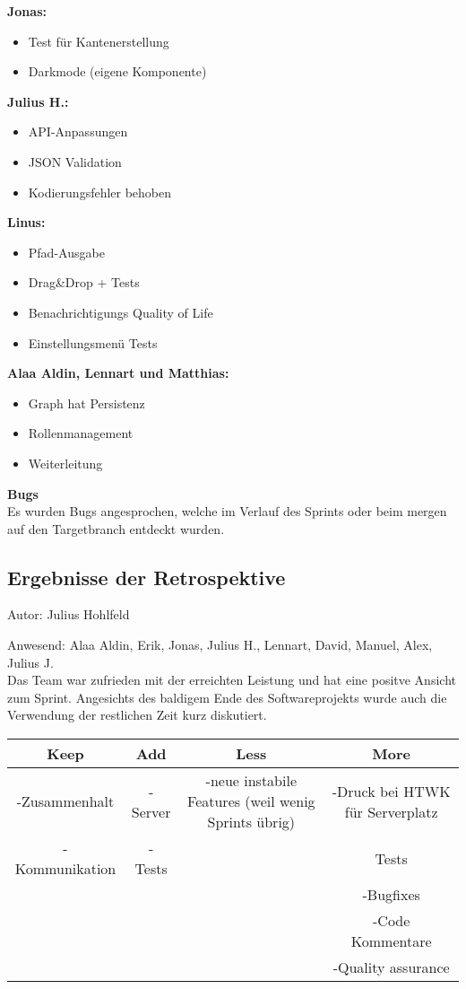 \textbf{Jonas:}
\begin{itemize}
\item Test für Kantenerstellung
\item Darkmode (eigene Komponente)
\end{itemize}

\textbf{Julius H.:}
\begin{itemize}
\item API-Anpassungen
\item JSON Validation
\item Kodierungsfehler behoben
\end{itemize}

\textbf{Linus:}
\begin{itemize}
\item Pfad-Ausgabe
\item Drag\&Drop + Tests
\item Benachrichtigungs Quality of Life
\item Einstellungsmenü Tests
\end{itemize}

\textbf{Alaa Aldin, Lennart und Matthias:}
\begin{itemize}
\item Graph hat Persistenz
\item Rollenmanagement
\item Weiterleitung
\end{itemize}

\textbf{Bugs}\\
Es wurden Bugs angesprochen, welche im Verlauf des Sprints oder beim mergen auf den Targetbranch entdeckt wurden.\\

\subsection{Ergebnisse der Retrospektive}
{\small Autor: Julius Hohlfeld}

Anwesend: Alaa Aldin, Erik, Jonas, Julius H., Lennart, David, Manuel, Alex, Julius J. \\

Das Team war zufrieden mit der erreichten Leistung und hat eine positve Ansicht zum Sprint. Angesichts des baldigem Ende des Softwareprojekts wurde auch die Verwendung der restlichen Zeit kurz diskutiert.\\

\begin{center}
\begin{tabular}{ |c|c|c|c| }
\hline
 Keep & Add & Less & More\\
\hline 
 -Zusammenhalt & -Server & -neue instabile Features (weil wenig Sprints übrig) & -Druck bei HTWK für Serverplatz \\
 -Kommunikation & - Tests & & Tests\\
 & & & -Bugfixes\\
 & & & -Code Kommentare\\
 & & & -Quality assurance\\
\hline     
\end{tabular}
\end{center}

